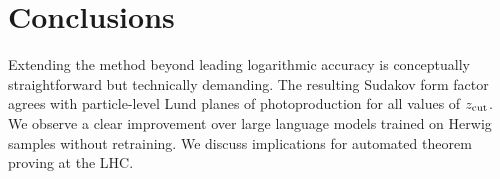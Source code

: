 \section{Conclusions}\label{sec:conclusions}

Extending the method beyond leading logarithmic accuracy is conceptually
straightforward but technically demanding. The resulting Sudakov form
factor agrees with particle-level Lund planes of photoproduction for all
values of $z_{\rm cut}$. We observe a clear improvement over large
language models trained on Herwig samples without retraining. We discuss
implications for automated theorem proving at the LHC.


